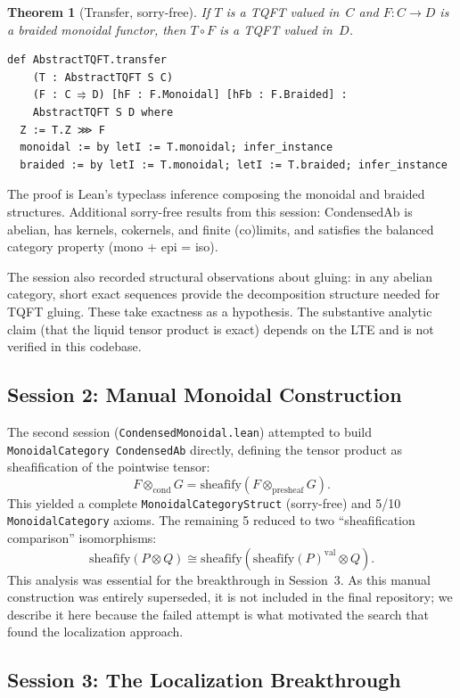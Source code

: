 \documentclass[11pt]{amsart}
\theoremstyle{plain}
\newtheorem{theorem}{Theorem}[section]
\theoremstyle{definition}
\newcommand{\CondAb}{\mathrm{CondensedAb}}
\begin{document}
\begin{theorem}[Transfer, sorry-free]
\label{thm:transfer}
If\/ $T$ is a TQFT valued in~$C$ and $F : C \to D$ is a braided monoidal functor, then $T \circ F$ is a TQFT valued in~$D$.
\end{theorem}

\begin{lstlisting}
def AbstractTQFT.transfer
    (T : AbstractTQFT S C)
    (F : C ⥤ D) [hF : F.Monoidal] [hFb : F.Braided] :
    AbstractTQFT S D where
  Z := T.Z ⋙ F
  monoidal := by letI := T.monoidal; infer_instance
  braided := by letI := T.monoidal; letI := T.braided; infer_instance
\end{lstlisting}

The proof is Lean's typeclass inference composing the monoidal and braided structures. Additional sorry-free results from this session: $\CondAb$ is abelian, has kernels, cokernels, and finite (co)limits, and satisfies the balanced category property (mono + epi = iso).

The session also recorded structural observations about gluing: in any abelian category, short exact sequences provide the decomposition structure needed for TQFT gluing. These take exactness as a hypothesis. The substantive analytic claim (that the liquid tensor product is exact) depends on the LTE and is not verified in this codebase.

\subsection{Session 2: Manual Monoidal Construction}

The second session (\texttt{CondensedMonoidal.lean}) attempted to build \texttt{MonoidalCategory CondensedAb} directly, defining the tensor product as sheafification of the pointwise tensor:
\[
F \otimes_{\mathrm{cond}} G = \mathrm{sheafify}(F \otimes_{\mathrm{presheaf}} G).
\]
This yielded a complete \texttt{MonoidalCategoryStruct} (sorry-free) and 5/10 \texttt{MonoidalCategory} axioms. The remaining 5 reduced to two ``sheafification comparison'' isomorphisms:
\[
\mathrm{sheafify}(P \otimes Q) \cong \mathrm{sheafify}(\mathrm{sheafify}(P)^{\mathrm{val}} \otimes Q).
\]
This analysis was essential for the breakthrough in Session~3. As this manual construction was entirely superseded, it is not included in the final repository; we describe it here because the failed attempt is what motivated the search that found the localization approach.

\subsection{Session 3: The Localization Breakthrough}
\end{document}
